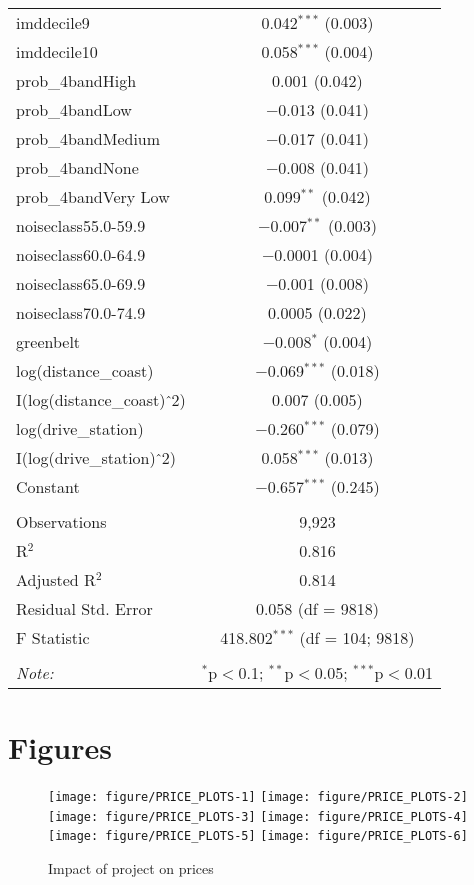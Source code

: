 \documentclass{article}\usepackage[]{graphicx}\usepackage[]{color}
\newenvironment{knitrout}{}{} %
\begin{document}
\begin{table}[!htbp]
\begin{tabular}{@{\extracolsep{5pt}}lc}
  imddecile9 & 0.042$^{***}$ (0.003) \\ 
  imddecile10 & 0.058$^{***}$ (0.004) \\ 
  prob\_4bandHigh & 0.001 (0.042) \\ 
  prob\_4bandLow & $-$0.013 (0.041) \\ 
  prob\_4bandMedium & $-$0.017 (0.041) \\ 
  prob\_4bandNone & $-$0.008 (0.041) \\ 
  prob\_4bandVery Low & 0.099$^{**}$ (0.042) \\ 
  noiseclass55.0-59.9 & $-$0.007$^{**}$ (0.003) \\ 
  noiseclass60.0-64.9 & $-$0.0001 (0.004) \\ 
  noiseclass65.0-69.9 & $-$0.001 (0.008) \\ 
  noiseclass70.0-74.9 & 0.0005 (0.022) \\ 
  greenbelt & $-$0.008$^{*}$ (0.004) \\ 
  log(distance\_coast) & $-$0.069$^{***}$ (0.018) \\ 
  I(log(distance\_coast)$\hat{\mkern6mu}$2) & 0.007 (0.005) \\ 
  log(drive\_station) & $-$0.260$^{***}$ (0.079) \\ 
  I(log(drive\_station)$\hat{\mkern6mu}$2) & 0.058$^{***}$ (0.013) \\ 
  Constant & $-$0.657$^{***}$ (0.245) \\ 
 \hline \\[-1.8ex] 
Observations & 9,923 \\ 
R$^{2}$ & 0.816 \\ 
Adjusted R$^{2}$ & 0.814 \\ 
Residual Std. Error & 0.058 (df = 9818) \\ 
F Statistic & 418.802$^{***}$ (df = 104; 9818) \\ 
\hline 
\hline \\[-1.8ex] 
\textit{Note:}  & \multicolumn{1}{r}{$^{*}$p$<$0.1; $^{**}$p$<$0.05; $^{***}$p$<$0.01} \\ 
\end{tabular} 
\end{table} 

\pagebreak
\section{Figures}

\begin{knitrout}\scriptsize
{}\color{fgcolor}\begin{figure}
\texttt{[image: figure/PRICE\_PLOTS-1]} 
\texttt{[image: figure/PRICE\_PLOTS-2]} 
\texttt{[image: figure/PRICE\_PLOTS-3]} 
\texttt{[image: figure/PRICE\_PLOTS-4]} 
\texttt{[image: figure/PRICE\_PLOTS-5]} 
\texttt{[image: figure/PRICE\_PLOTS-6]} \caption[Impact of project on prices]{Impact of project on prices}\label{fig:PRICE_PLOTS}
\end{figure}


\end{knitrout}
\end{document}
